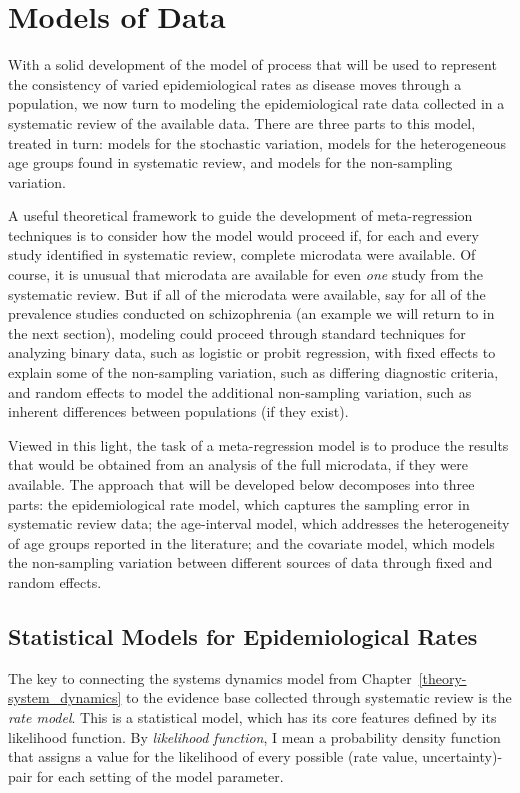 \chapter{Models of Data}
With a solid development of the model of process that will be used to
represent the consistency of varied epidemiological rates as disease
moves through a population, we now turn to modeling the
epidemiological rate data collected in a systematic review of the
available data.  There are three parts to this model, treated in turn:
models for the stochastic variation, models for the heterogeneous age
groups found in systematic review, and models for the non-sampling
variation.

A useful theoretical framework to guide the development of
meta-regression techniques is to consider how the model would proceed
if, for each and every study identified in systematic review, complete
microdata were available.  Of course, it is unusual that microdata are
available for even \emph{one} study from the systematic review.  But
if all of the microdata were available, say for all of the prevalence
studies conducted on schizophrenia (an example we will return to in
the next section), modeling could proceed through standard techniques
for analyzing binary data, such as logistic or probit regression, with
fixed effects to explain some of the non-sampling variation, such as
differing diagnostic criteria, and random effects to model the
additional non-sampling variation, such as inherent differences
between populations (if they exist).

Viewed in this light, the task of a meta-regression model is to
produce the results that would be obtained from an analysis of the
full microdata, if they were available. The approach that will be
developed below decomposes into three parts: the epidemiological rate
model, which captures the sampling error in systematic review data;
the age-interval model, which addresses the heterogeneity of age
groups reported in the literature; and the covariate model, which
models the non-sampling variation between different sources of data
through fixed and random effects.

\section{Statistical Models for Epidemiological Rates}
\label{theory-rate_model}

The key to connecting the systems dynamics model from
Chapter~\ref{theory-system_dynamics} to the evidence base collected
through systematic review is the \emph{rate model}.  This is a
statistical model, which has its core features defined by its
likelihood function.  By \emph{likelihood function}, I mean a
probability density function that assigns a value for the likelihood
of every possible (rate value, uncertainty)-pair for each setting of
the model parameter.

